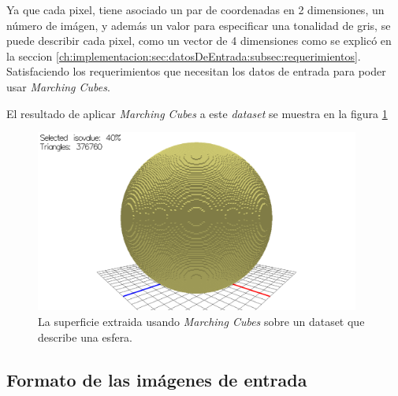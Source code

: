 Ya que cada pixel, tiene asociado un par de coordenadas en 2 dimensiones, un número de imágen, y además un valor para especificar una tonalidad de gris, se puede describir cada pixel, como un vector de 4 dimensiones como se explicó en la seccion \ref{ch:implementacion:sec:datosDeEntrada:subsec:requerimientos}. Satisfaciendo los requerimientos que necesitan los datos de entrada para poder usar \emph{Marching Cubes}.

El resultado de aplicar \emph{Marching Cubes} a este \emph{dataset} se muestra en la figura \ref{f:implementacion:ImSphRad100:screenshot_40}

\begin{figure}[hbt]
	\centering
	\includegraphics[width=0.95\textwidth]
	{images/results/ImSphRad100/screenshot_40.png}
	\caption{La superficie extraida usando \emph{Marching Cubes} sobre un dataset que describe una esfera.}
	\label{f:implementacion:ImSphRad100:screenshot_40}
\end{figure}

\subsection{Formato de las imágenes de entrada}
\label{ch:implementacion:sec:datosDeEntrada:subsec:formatodelasimagenesdeentrada}
